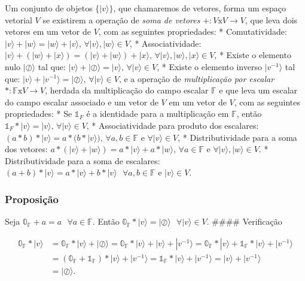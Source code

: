 \documentclass[11pt]{article}
\begin{document}
Um conjunto de objetos \(\{|v\rangle\}\), que chamaremos de vetores,
forma um espaço vetorial \(V\) se existirem a operação de \emph{soma de
vetores} \(+:V\text{x}V\rightarrow V\), que leva dois vetores em um
vetor de \(V\), com as seguintes propriedades: * Comutatividade:
\(|v\rangle+|w\rangle=|w\rangle+|v\rangle\text{, }\forall|v\rangle,|w\rangle\in V\),
* Associatividade:
\(|v\rangle+(|w\rangle+|x\rangle)=(|v\rangle+|w\rangle)+|x\rangle\text{, }\forall|v\rangle,|w\rangle,|x\rangle\in V\),
* Existe o elemento nulo \(|\oslash\rangle\) tal que:
\(|v\rangle+|\oslash\rangle=|v\rangle\text{, }\forall|v\rangle\in V\), *
Existe o elemento inverso \(|v^{-1}\rangle\) tal que:
\(|v\rangle+|v^{-1}\rangle=|\oslash\rangle\text{, }\forall|v\rangle\in V\),
e a operação de \emph{multiplicação por escalar}
\(*:\mathbb{F}\text{x}V\rightarrow V\), herdada da multiplicação do
campo escalar \(\mathbb{F}\) e que leva um escalar do campo escalar
associado e um vetor de \(V\) em um vetor de \(V\), com as seguintes
propriedades: * Se \(\mathbb{1}_{F}\) é a identidade para a
multiplicação em \(\mathbb{F}\), então
\(\mathbb{1}_{F}*|v\rangle=|v\rangle\text{, }\forall|v\rangle\in V\), *
Associatividade para produto dos escalares:
\((a*b)*|v\rangle=a*(b*|v\rangle)\text{, }\forall a,b\in\mathbb{F}\text{ e }\forall|v\rangle\in V\),
* Distributividade para a soma dos vetores:
\(a*(|v\rangle+|w\rangle)=a*|v\rangle+a*|w\rangle\text{, }\forall a\in\mathbb{F}\text{ e }\forall|v\rangle,|w\rangle\in V\).
* Distributividade para a soma de escalares:
\((a+b)*|v\rangle = a*|v\rangle+b*|v\rangle\text{ }\forall a,b\in\mathbb{F}\text{ e }|v\rangle\in V\).

    \subsubsection{Proposição}\label{proposiuxe7uxe3o}

Seja \(\mathbb{0}_{\mathbb{F}}+a=a\text{ }\forall a\in \mathbb{F}\).
Então
\(\mathbb{0}_{\mathbb{F}}*|v\rangle=|\oslash\rangle\text{ }\forall|v\rangle\in V\).
\#\#\#\# Verificação

\begin{align}
\mathbb{0}_{\mathbb{F}}*|v\rangle & = \mathbb{0}_{\mathbb{F}}*|v\rangle+|\oslash\rangle = \mathbb{0}_{\mathbb{F}}*|v\rangle+|v\rangle+|v^{-1}\rangle = \mathbb{0}_{\mathbb{F}}*|v\rangle+\mathbb{1}_{\mathbb{F}}*|v\rangle+|v^{-1}\rangle \\ 
& = (\mathbb{0}_{\mathbb{F}}+\mathbb{1}_{\mathbb{F}})*|v\rangle+|v^{-1}\rangle = \mathbb{1}_{\mathbb{F}}*|v\rangle+|v^{-1}\rangle = |v\rangle+|v^{-1}\rangle \\
& = |\oslash\rangle.
\end{align}
\end{document}
